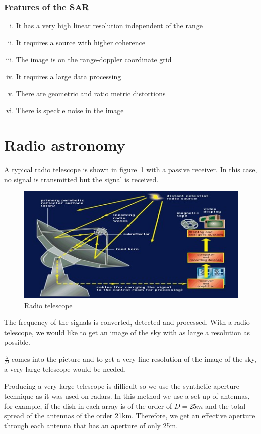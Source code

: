 \subsubsection*{Features of the SAR}
\begin{enumerate}[(i)]
\item It has a very high linear resolution independent of the range
\item It requires a source with higher coherence
\item The image is on the range-doppler coordinate grid
\item It requires a large data processing
\item There are geometric and ratio metric distortions
\item There is speckle noise in the image
\end{enumerate}

\section{Radio astronomy} 

A typical radio telescope is shown in figure~\ref{fig:radiotelescope0} with a passive receiver. In this case, no signal is transmitted but the signal is received.
\begin{figure}[h]
\centering
\includegraphics[scale=0.5]{./graphics/Radio-Telescope-0}
\caption{Radio telescope}
\label{fig:radiotelescope0}
\end{figure}

The frequency of the signals is converted, detected and processed. With a radio telescope, we would like to get an image of the sky with as large a resolution as possible.

$\frac{\lambda}{D}$ comes into the picture and to get a very fine resolution of the image of the sky, a very large telescope would be needed.


Producing a very large telescope is difficult so we use the synthetic aperture technique as it was used on radars. In this method we use a set-up of antennas, for example, if the dish in each array is of the order of $ D = 25m $ and the total spread of the antennas of the order 21km. Therefore, we get an effective aperture through each antenna that has an aperture of only 25m.

